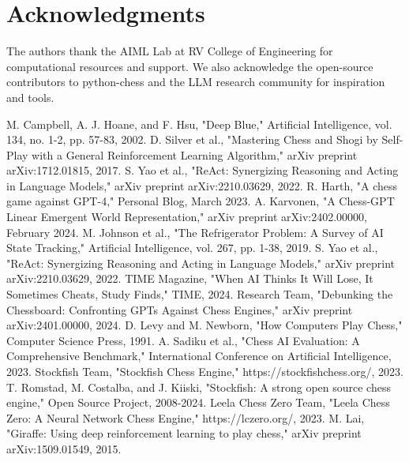 \documentclass[conference]{IEEEtran}
\begin{document}
\section*{Acknowledgments}
The authors thank the AIML Lab at RV College of Engineering for computational resources and support. We also acknowledge the open-source contributors to python-chess and the LLM research community for inspiration and tools.

\begin{thebibliography}{99}
 M. Campbell, A. J. Hoane, and F. Hsu, "Deep Blue," Artificial Intelligence, vol. 134, no. 1-2, pp. 57-83, 2002.
 D. Silver et al., "Mastering Chess and Shogi by Self-Play with a General Reinforcement Learning Algorithm," arXiv preprint arXiv:1712.01815, 2017.
 S. Yao et al., "ReAct: Synergizing Reasoning and Acting in Language Models," arXiv preprint arXiv:2210.03629, 2022.
 R. Harth, "A chess game against GPT-4," Personal Blog, March 2023.
 A. Karvonen, "A Chess-GPT Linear Emergent World Representation," arXiv preprint arXiv:2402.00000, February 2024.
 M. Johnson et al., "The Refrigerator Problem: A Survey of AI State Tracking," Artificial Intelligence, vol. 267, pp. 1-38, 2019.
 S. Yao et al., "ReAct: Synergizing Reasoning and Acting in Language Models," arXiv preprint arXiv:2210.03629, 2022.
 TIME Magazine, "When AI Thinks It Will Lose, It Sometimes Cheats, Study Finds," TIME, 2024.
 Research Team, "Debunking the Chessboard: Confronting GPTs Against Chess Engines," arXiv preprint arXiv:2401.00000, 2024.
 D. Levy and M. Newborn, "How Computers Play Chess," Computer Science Press, 1991.
 A. Sadiku et al., "Chess AI Evaluation: A Comprehensive Benchmark," International Conference on Artificial Intelligence, 2023.
 Stockfish Team, "Stockfish Chess Engine," https://stockfishchess.org/, 2023.
 T. Romstad, M. Costalba, and J. Kiiski, "Stockfish: A strong open source chess engine," Open Source Project, 2008-2024.
 Leela Chess Zero Team, "Leela Chess Zero: A Neural Network Chess Engine," https://lczero.org/, 2023.
 M. Lai, "Giraffe: Using deep reinforcement learning to play chess," arXiv preprint arXiv:1509.01549, 2015.

\end{thebibliography}
\end{document}
